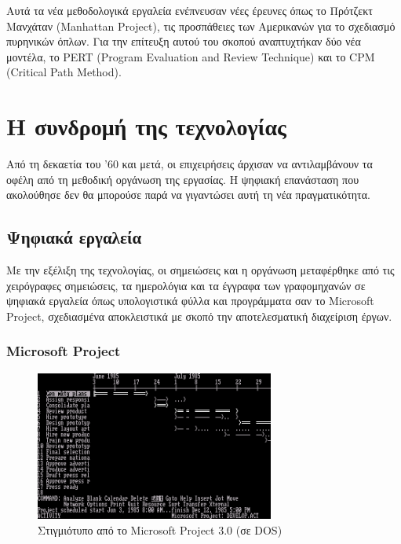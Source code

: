             Αυτά τα νέα μεθοδολογικά εργαλεία ενέπνευσαν νέες έρευνες όπως το Πρότζεκτ Μανχάταν (Manhattan Project), τις προσπάθειες των Αμερικανών για το σχεδιασμό πυρηνικών όπλων. Για την επίτευξη αυτού του σκοπού αναπτυχτήκαν δύο νέα μοντέλα, το PERT (Program Evaluation and Review Technique) και το CPM (Critical Path Method). \cite{SaylorAcademyProjectManagement}
            
    \section{Η συνδρομή της τεχνολογίας}
        Από τη δεκαετία του '60 και μετά, οι επιχειρήσεις άρχισαν να αντιλαμβάνουν τα οφέλη από τη μεθοδική οργάνωση της εργασίας. Η ψηφιακή επανάσταση που ακολούθησε δεν θα μπορούσε παρά να γιγαντώσει αυτή τη νέα πραγματικότητα.
    
        \subsection{Ψηφιακά εργαλεία}
            Με την εξέλιξη της τεχνολογίας, οι σημειώσεις και η οργάνωση μεταφέρθηκε από τις χειρόγραφες σημειώσεις, τα ημερολόγια και τα έγγραφα των γραφομηχανών σε ψηφιακά εργαλεία όπως υπολογιστικά φύλλα και προγράμματα σαν το Microsoft Project, σχεδιασμένα αποκλειστικά με σκοπό την αποτελεσματική διαχείριση έργων. 

            \subsubsection{Microsoft Project}
                \begin{figure}[H] \noindent \centering
                    \includegraphics[width=0.7\textwidth]{img/MicrosoftProject3.png}
                    \caption{\centering Στιγμιότυπο από το Microsoft Project 3.0 (σε DOS) \cite{WinWorld}}
                \end{figure}
                

